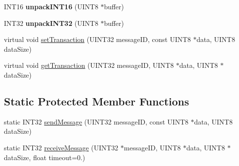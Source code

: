 \begin{DoxyCompactItemize}
\item 
\hypertarget{class_l_r_t_c_a_n_jaguar_a1739bd826bf714796239d8e305ec91cf}{
\-I\-N\-T16 {\bfseries unpack\-I\-N\-T16} (\-U\-I\-N\-T8 $\ast$buffer)}
\label{class_l_r_t_c_a_n_jaguar_a1739bd826bf714796239d8e305ec91cf}

\item 
\hypertarget{class_l_r_t_c_a_n_jaguar_a0a9e441ca1ed6096e5ed6a952dbf6b1e}{
\-I\-N\-T32 {\bfseries unpack\-I\-N\-T32} (\-U\-I\-N\-T8 $\ast$buffer)}
\label{class_l_r_t_c_a_n_jaguar_a0a9e441ca1ed6096e5ed6a952dbf6b1e}

\item 
virtual void \hyperlink{class_l_r_t_c_a_n_jaguar_aed313d05f75459cc5af69f0dd03beaa4}{set\-Transaction} (\-U\-I\-N\-T32 message\-I\-D, const \-U\-I\-N\-T8 $\ast$data, \-U\-I\-N\-T8 data\-Size)
\item 
virtual void \hyperlink{class_l_r_t_c_a_n_jaguar_a6717849e5854c537f4633503dd4d5a54}{get\-Transaction} (\-U\-I\-N\-T32 message\-I\-D, \-U\-I\-N\-T8 $\ast$data, \-U\-I\-N\-T8 $\ast$data\-Size)
\end{DoxyCompactItemize}
\subsection*{\-Static \-Protected \-Member \-Functions}
\begin{DoxyCompactItemize}
\item 
static \-I\-N\-T32 \hyperlink{class_l_r_t_c_a_n_jaguar_aa8fb882c8c9e0a11b77841c1fc77ebce}{send\-Message} (\-U\-I\-N\-T32 message\-I\-D, const \-U\-I\-N\-T8 $\ast$data, \-U\-I\-N\-T8 data\-Size)
\item 
static \-I\-N\-T32 \hyperlink{class_l_r_t_c_a_n_jaguar_aa9bab34297080b9e269f39a0ed0c59ef}{receive\-Message} (\-U\-I\-N\-T32 $\ast$message\-I\-D, \-U\-I\-N\-T8 $\ast$data, \-U\-I\-N\-T8 $\ast$data\-Size, float timeout=0.)
\end{DoxyCompactItemize}
